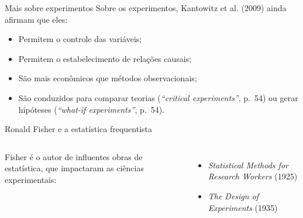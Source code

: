 \documentclass[numbering=fraction,aspectratio=169]{beamer}
\begin{document}
\begin{frame}{Mais sobre experimentos}
  Sobre os experimentos, Kantowitz et al. (2009) ainda afirmam que eles:

  \begin{itemize}
  \item Permitem o \alert{controle das variáveis};
  \item Permitem o estabelecimento de \alert{relações causais};
  \item São \alert{mais econômicos} que métodos observacionais;
  \item São conduzidos para comparar teorias (\emph{“critical experiments”}, p.~54) ou gerar hipóteses (\emph{“what-if experiments”}, p.~54).
  \end{itemize}
\end{frame}

\begin{frame}{Ronald Fisher e a estatística frequentista}
  \begin{columns}
    Fisher é o autor de influentes obras de estatística, que impactaram as ciências experimentais:

    \begin{itemize}
    \item<1-> \emph{Statistical Methods for Research Workers} (1925)
    \item<2-> \emph{The Design of Experiments} (1935)
    \end{itemize}
    \centering
  \end{columns}
\end{frame}
\end{document}
